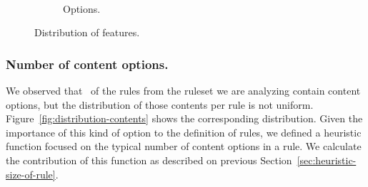 \documentclass[sigconf,review, anonymous]{acmart}
\begin{document}
\begin{figure}[t!]
\begin{subfigure}{.25\textwidth}
\end{subfigure}%
\\
\begin{subfigure}{.2\textwidth}
  \centering
  \vspace{-5ex}      
  \caption{\label{fig:distribution-strings}Options.}
\end{subfigure}%
\vspace{-1ex}
\caption{Distribution of features.}
\end{figure}

\subsubsection{Number of content options.} We observed
that \percContentOptions\ of the rules from the ruleset we are
analyzing contain content options, but the distribution of those
contents per rule is not uniform. Figure~\ref{fig:distribution-contents} shows the
corresponding distribution. Given the importance of this kind of
option to the definition of rules, we defined a heuristic function
focused on the typical number of content options in a rule. We
calculate the contribution of this function as described on previous
Section~\ref{sec:heuristic-size-of-rule}. 


\end{document}
